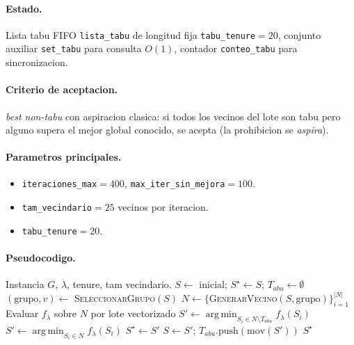 \documentclass[11pt,a4paper]{article}
\newcommand{\code}[1]{\texttt{#1}}
\DeclareMathOperator*{\argmin}{arg\,min}
\begin{document}
\paragraph{Estado.} Lista tabu FIFO \code{lista\_tabu} de longitud
fija \code{tabu\_tenure}$=20$, conjunto auxiliar \code{set\_tabu} para
consulta $O(1)$, contador \code{conteo\_tabu} para sincronizacion.

\paragraph{Criterio de aceptacion.} \emph{best non-tabu} con
aspiracion clasica: si todos los vecinos del lote son tabu pero alguno
supera el mejor global conocido, se acepta (la prohibicion se
\emph{aspira}).

\paragraph{Parametros principales.}
\begin{itemize}
\item \code{iteraciones\_max}$=400$, \code{max\_iter\_sin\_mejora}$=100$.
\item \code{tam\_vecindario}$=25$ vecinos por iteracion.
\item \code{tabu\_tenure}$=20$.
\end{itemize}

\paragraph{Pseudocodigo.}
\begin{algorithm}[H]
\caption{Tabu Search Simple}
\begin{algorithmic}[1]
\Require Instancia $G$, $\lambda$, tenure, tam vecindario.
\State $S \gets$ inicial; $S^\star \gets S$; $T_{abu}\gets \emptyset$
  \State $(\text{grupo}, v) \gets$ \textsc{SeleccionarGrupo}$(S)$
  \State $N \gets \{$\textsc{GenerarVecino}$(S, \text{grupo})\}_{i=1}^{|N|}$
  \State Evaluar $f_\lambda$ sobre $N$ por lote vectorizado
  \State $S' \gets \argmin_{S_i \in N \setminus T_{abu}} f_\lambda(S_i)$
     \State $S' \gets \argmin_{S_i \in N} f_\lambda(S_i)$
  \EndIf
   
     \State $S^\star \gets S'$
  \EndIf
  \State $S \gets S'$;\; $T_{abu}.\text{push}(\text{mov}(S'))$
\EndFor
\State \Return $S^\star$
\end{algorithmic}
\end{algorithm}
\end{document}
